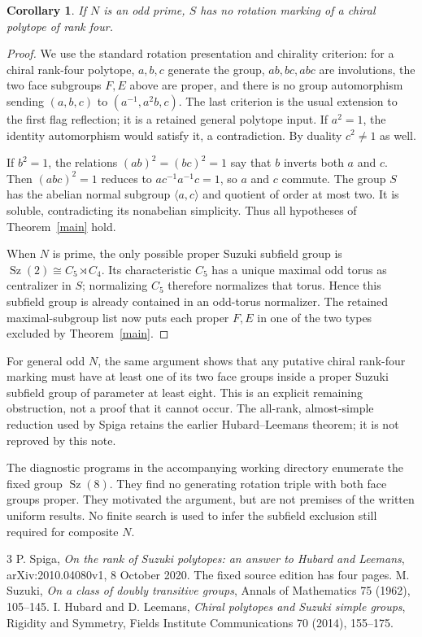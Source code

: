 \documentclass[11pt,a4paper]{article}
\newtheorem{corollary}[lemma]{Corollary}
\newcommand{\gen}[1]{\langle#1\rangle}
\begin{document}
\begin{corollary}\label{prime}
If $N$ is an odd prime, $S$ has no rotation marking of a chiral
polytope of rank four.
\end{corollary}
\begin{proof}
We use the standard rotation presentation and chirality criterion:
for a chiral rank-four polytope, $a,b,c$ generate the group,
$ab,bc,abc$ are involutions, the two face subgroups $F,E$ above
are proper, and there is no group automorphism sending
$(a,b,c)$ to $(a^{-1},a^2b,c)$. The last criterion is the usual
extension to the first flag reflection; it is a retained general
polytope input. If $a^2=1$, the identity automorphism would satisfy
it, a contradiction. By duality $c^2\ne1$ as well.

If $b^2=1$, the relations $(ab)^2=(bc)^2=1$ say that $b$
inverts both $a$ and $c$. Then $(abc)^2=1$ reduces to
$ac^{-1}a^{-1}c=1$, so $a$ and $c$ commute. The group
$S$ has the abelian normal subgroup $\gen{a,c}$ and quotient of
order at most two. It is soluble, contradicting its nonabelian
simplicity. Thus all hypotheses of Theorem~\ref{main} hold.

When $N$ is prime, the only possible proper Suzuki subfield group
is $\operatorname{Sz}(2)\cong C_5\rtimes C_4$. Its characteristic
$C_5$ has a unique maximal odd torus as centralizer in $S$;
normalizing $C_5$ therefore normalizes that torus. Hence this
subfield group is already contained in an odd-torus normalizer.
The retained maximal-subgroup list now puts each proper $F,E$ in
one of the two types excluded by Theorem~\ref{main}.
\end{proof}

For general odd $N$, the same argument shows that any putative chiral
rank-four marking must have at least one of its two face groups inside
a proper Suzuki subfield group of parameter at least eight. This is an
explicit remaining obstruction, not a proof that it cannot occur. The
all-rank, almost-simple reduction used by Spiga retains the earlier
Hubard--Leemans theorem; it is not reproved by this note.

The diagnostic programs in the accompanying working directory enumerate
the fixed group $\operatorname{Sz}(8)$. They find no generating rotation
triple with both face groups proper. They motivated the argument, but
are not premises of the written uniform results. No finite search is
used to infer the subfield exclusion still required for composite $N$.

\begin{thebibliography}{3}
 P. Spiga, \emph{On the rank of Suzuki polytopes: an
answer to Hubard and Leemans}, arXiv:2010.04080v1, 8 October 2020.
The fixed source edition has four pages.
 M. Suzuki, \emph{On a class of doubly transitive
groups}, Annals of Mathematics 75 (1962), 105--145.
 I. Hubard and D. Leemans, \emph{Chiral polytopes and
Suzuki simple groups}, Rigidity and Symmetry, Fields Institute
Communications 70 (2014), 155--175.
\end{thebibliography}
\end{document}
